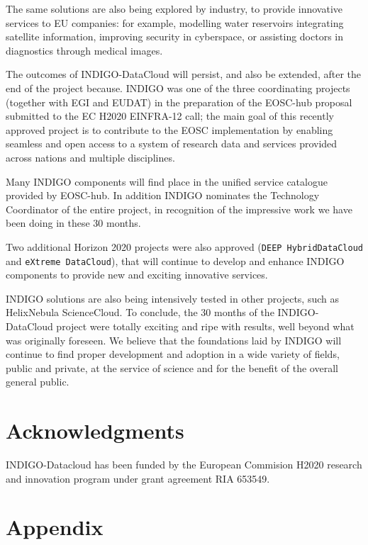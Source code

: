 \documentclass{article}
\begin{document}
The same solutions are also being explored by industry, to provide innovative services to EU companies: for example, modelling water reservoirs integrating satellite information, improving security in cyberspace, or assisting doctors in diagnostics through medical images. 

The outcomes of INDIGO-DataCloud will persist, and also be extended, after the end of the project because. INDIGO was one of the three coordinating projects (together with EGI and EUDAT) in the preparation of the EOSC-hub proposal submitted to the EC H2020 EINFRA-12 call; the main goal of this recently approved project is to contribute to the EOSC implementation by enabling seamless and open access to a system of research data and services provided across nations and multiple disciplines. 

Many INDIGO components will find place in the unified service catalogue provided by EOSC-hub. In addition INDIGO nominates the Technology Coordinator of the entire project, in recognition of the impressive work we have been doing in these 30 months. 

Two additional Horizon 2020 projects were also approved ({\tt DEEP HybridDataCloud} and {\tt eXtreme DataCloud}), that will continue to develop and enhance INDIGO components to provide new and exciting innovative services. 

INDIGO solutions are also being intensively tested in other projects, such as HelixNebula ScienceCloud. To conclude, the 30 months of the INDIGO-DataCloud project were totally exciting and ripe with results, well beyond what was originally foreseen. We believe that the foundations laid by INDIGO will continue to find proper development and adoption in a wide variety of fields, public and private, at the service of science and for the benefit of the overall general public.  

\section*{Acknowledgments}
INDIGO-Datacloud has been funded by the European Commision H2020 research and innovation program under grant agreement RIA 653549. 





\section*{Appendix}
\end{document}
